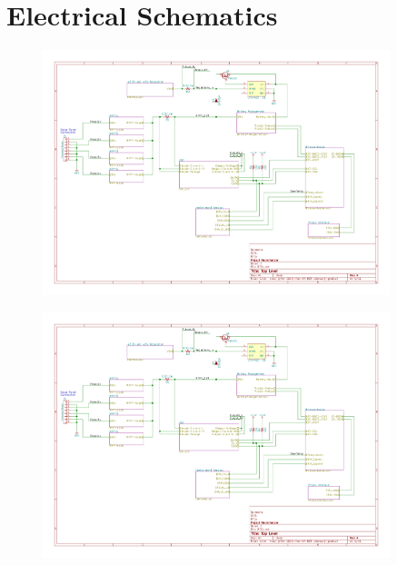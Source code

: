 \documentclass{article}
\makeatletter
\numberwithin{figure}{section}
\numberwithin{equation}{section}
\let\oldappendix\appendix %
\renewcommand\appendix{%
    \oldappendix
    \newcommand{\section@cntformat}{\appendixname~\thesection\quad}
}
\makeatother
\begin{document}
{\newpage
\vspace*{\fill}
\section*{}
\vspace*{\fill}
\newpage
\appendix
\section{Electrical Schematics} \label{sect:appendixA}

\begin{figure}[H]
	\centering
	\includegraphics[page=1,width=0.9\textwidth]{RFCxSchematics.pdf}
	\caption{}
	\label{fig:schemp1}
\end{figure}

\begin{figure}[H]
	\centering
	\includegraphics[page=2,width=0.9\textwidth]{RFCxSchematics.pdf}
	\caption{}
	\label{fig:schemp2}
\end{figure}

}
\end{document}
